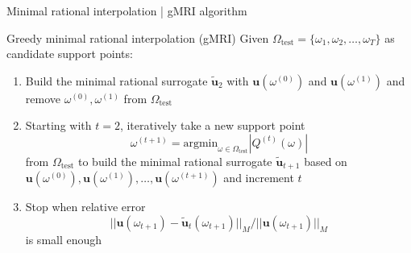 \documentclass{beamer}
\begin{document}
\begin{frame}{Minimal rational interpolation | gMRI algorithm}
    
    \begin{block}{Greedy minimal rational interpolation (gMRI) \cite{shortMRI}}
        Given $\Omega_{\text{test}} = \{\omega_1, \omega_2, \dots, \omega_T\}$ as candidate support points:
        \begin{enumerate}
            \item<2-> Build the minimal rational surrogate $\mathbf{\tilde{u}}_{2}$
                      with $\mathbf{u}(\omega^{(0)})$ and $\mathbf{u}(\omega^{(1)})$
                      and remove $\omega^{(0)}, \omega^{(1)}$ from $\Omega_{\text{test}}$
            \item<3-> Starting with $t=2$, iteratively take a new support point
            \begin{equation*}
                \omega^{(t+1)} = \text{argmin}_{\omega \in \Omega_{\text{test}}} |Q^{(t)}(\omega)|
            \end{equation*}
            from $\Omega_{\text{test}}$ to build the minimal rational surrogate $\mathbf{\tilde{u}}_{t+1}$
            based on $\mathbf{u}(\omega^{(0)}), \mathbf{u}(\omega^{(1)}), \dots, \mathbf{u}(\omega^{(t+1)})$
            and increment $t$
            \item<4-> Stop when relative error 
            \begin{equation*}
                ||\mathbf{u}(\omega_{t+1}) - \mathbf{\tilde{u}}_{t}(\omega_{t+1})||_M / ||\mathbf{u}(\omega_{t+1})||_M
            \end{equation*}
            is small enough
        \end{enumerate}
    \end{block}

\end{frame}
\end{document}
